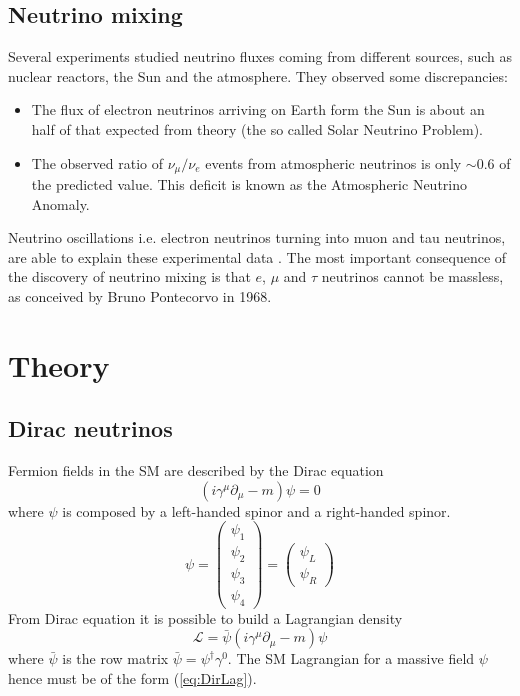 \documentclass{subnucbo}
\begin{document}
\subsection{Neutrino mixing}
Several experiments studied neutrino fluxes coming from different sources, such as nuclear reactors, the Sun and the atmosphere. They observed some discrepancies:
\begin{itemize}
\item The flux of electron neutrinos arriving on Earth form the Sun is about an half of that expected from theory (the so called Solar Neutrino Problem).
\item The observed ratio of $\nu_{\mu}/\nu_e$ events from atmospheric neutrinos is only $\sim0.6$ of the predicted value. This deficit is known as the Atmospheric Neutrino Anomaly.
\end{itemize}
Neutrino oscillations i.e. electron neutrinos turning into muon and tau neutrinos, are able to explain these experimental data \cite{ref:wrap}. The most important consequence of the discovery of neutrino mixing is that $e$, $\mu$ and $\tau$ neutrinos cannot be massless, as conceived by Bruno Pontecorvo in 1968. 

\section{Theory}
\subsection{Dirac neutrinos}
Fermion fields in the SM are described by the Dirac equation 
\begin{equation}
\label{eq:dir}
(i\gamma^{\mu}\partial_{\mu}-m)\psi=0
\end{equation}
where $\psi$ is composed by a left-handed spinor and a right-handed spinor. %
\begin{equation} 
\psi=\begin{pmatrix}\psi_1\\ \psi_2 \\ \psi_3 \\ \psi_4 \end{pmatrix}=\begin{pmatrix}\psi_L\\ \psi_R \end{pmatrix}
\end{equation}
From Dirac equation it is possible to build a Lagrangian density
\begin{equation}
\label{eq:DirLag}
\mathcal{L}=\bar{\psi}(i\gamma^{\mu}\partial_{\mu}-m)\psi
\end{equation}
where $\bar{\psi}$ is the row matrix $\bar{\psi}=\psi^{\dagger}\gamma^0$.
The SM Lagrangian for a massive field $\psi$ hence must be of the form (\ref{eq:DirLag}).
\end{document}

